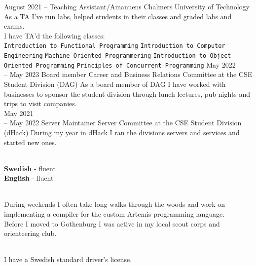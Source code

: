 \documentclass[9pt]{developercv}
\begin{document}
\begin{entrylist}
	\entry
		{August 2021 -- }
		{Teaching Assistant/Amanuens}
		{Chalmers University of Technology}
		{
			As a TA I've run labs, helped students in their classes and
			graded labs and exams.\\ I have TA'd the following classes:\\
			\texttt{Introduction to Functional Programming}\slashsep
			\texttt{Introduction to Computer Engineering}\slashsep
			\texttt{Machine Oriented Programmering}\slashsep
			\texttt{Introduction to Object Oriented Programming}\slashsep
			\texttt{Principles of Concurrent Programming}
		}
	\entry
		{May 2022 \\-- May 2023}
		{Board member}
		{Career and Business Relations Committee at the CSE Student Division (DAG)}
		{
			As a board member of DAG I have worked with
			businesses to sponsor the student division through
			lunch lectures, pub nights and trips to visit
			companies.\\
		}
	\entry
		{May 2021 \\-- May 2022}
		{Server Maintainer}
		{Server Committee at the CSE Student Division (dHack)}
		{
			During my year in dHack I ran the divisions servers and services and started new ones.\\
		}
\end{entrylist}
\begin{minipage}[t]{0.2\textwidth}
	\vspace{-\baselineskip}
	\\
	\textbf{Swedish} - fluent\\
	\textbf{English} - fluent
\end{minipage}
\hfill
\begin{minipage}[t]{0.4\textwidth}
	\vspace{-\baselineskip}
	\\During weekends I often take long walks through the woods and work
	on implementing a compiler for the custom Artemis programming language.
	\\ Before I moved to Gothenburg I was active in my local scout corps and
	orienteering club.
\end{minipage}
\hfill
\begin{minipage}[t]{0.3\textwidth}
	\vspace{-\baselineskip}
	\\I have a Swedish standard driver's license.
\end{minipage}
\end{document}

